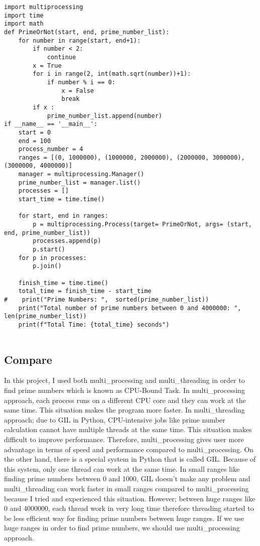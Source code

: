 \documentclass[onecolumn]{article}
\begin{document}
\begin{verbatim}
import multiprocessing
import time
import math
def PrimeOrNot(start, end, prime_number_list):
    for number in range(start, end+1):
        if number < 2:
            continue
        x = True
        for i in range(2, int(math.sqrt(number))+1):
            if number % i == 0:
                x = False
                break
        if x :
            prime_number_list.append(number)
if __name__ == '__main__':
    start = 0
    end = 100
    process_number = 4
    ranges = [(0, 1000000), (1000000, 2000000), (2000000, 3000000), (3000000, 4000000)]
    manager = multiprocessing.Manager()
    prime_number_list = manager.list()
    processes = []
    start_time = time.time()

    for start, end in ranges:
        p = multiprocessing.Process(target= PrimeOrNot, args= (start, end, prime_number_list))
        processes.append(p)
        p.start()
    for p in processes:
        p.join()

    finish_time = time.time()
    total_time = finish_time - start_time
#    print("Prime Numbers: ",  sorted(prime_number_list))
    print("Total number of prime numbers between 0 and 4000000: ",  len(prime_number_list))
    print(f"Total Time: {total_time} seconds")


\end{verbatim}

\subsection{Compare}

In this project, I used both multi\_processing and multi\_threading in order to find prime numbers which is known as CPU-Bound Task. In multi\_processing approach, each process runs on a different CPU core and they can work at the same time. This situation makes the program more faster. In multi\_threading approach; due to GIL in Python, CPU-intensive jobs like prime number calculation cannot have multiple threads at the same time. This situation makes difficult to improve performance. Therefore, multi\_processing gives user more advantage in terms of speed and performance compared to multi\_processing. On the other hand, there is a special system in Python that is called GIL. Because of this system, only one thread can work at the same time. In small ranges like finding prime numbers between 0 and 1000, GIL doesn't make any problem and multi\_threading can work faster in small ranges compared to multi\_processing because I tried and experienced this situation. However; between huge ranges like 0 and 4000000, each thread work in very long time therefore threading started to be less efficient way for finding prime numbers between huge ranges. If we use huge ranges in order to find prime numbers, we should use multi\_processing approach.
\end{document}
